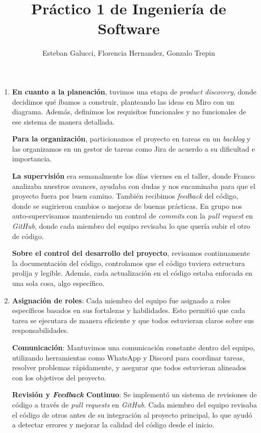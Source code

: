\documentclass{article}
\title{Práctico 1 de Ingeniería de Software}
\author{Esteban Galucci, Florencia Hernandez, Gonzalo Trepin}
\date{}
\begin{document}
\maketitle

\begin{enumerate}

    \item
    \textbf{En cuanto a la planeación}, tuvimos una etapa de \textit{product discovery}, donde decidimos qué íbamos a construir, planteando las ideas en Miro con un diagrama. Además, definimos los requisitos funcionales y no funcionales de ese sistema de manera detallada.

    \textbf{Para la organización}, particionamos el proyecto en tareas en un \textit{backlog} y las organizamos en un gestor de tareas como Jira de acuerdo a su dificultad e importancia.

    \textbf{La supervisión} era semanalmente los días viernes en el taller, donde Franco analizaba nuestros avances, ayudaba con dudas y nos encaminaba para que el proyecto fuera por buen camino. También recibimos \textit{feedback} del código, donde se sugirieron cambios o mejoras de buenas prácticas. En grupo nos auto-supervisamos manteniendo un control de \textit{commits} con la \textit{pull request} en \textit{GitHub}, donde cada miembro del equipo revisaba lo que quería subir el otro de código.

    \textbf{Sobre el control del desarrollo del proyecto}, revisamos continuamente la documentación del código, controlamos que el código tuviera estructura prolija y legible. Además, cada actualización en el código estaba enfocada en una sola cosa, algo específico.

    \item
    \textbf{Asignación de roles}: Cada miembro del equipo fue asignado a roles específicos basados en sus fortalezas y habilidades. Esto permitió que cada tarea se ejecutara de manera eficiente y que todos estuvieran claros sobre sus responsabilidades.

    \textbf{Comunicación}: Mantuvimos una comunicación constante dentro del equipo, utilizando herramientas como WhatsApp y Discord para coordinar tareas, resolver problemas rápidamente, y asegurar que todos estuvieran alineados con los objetivos del proyecto.

    \textbf{Revisión y \textit{Feedback} Continuo}: Se implementó un sistema de revisiones de código a través de \textit{pull requests} en \textit{GitHub}. Cada miembro del equipo revisaba el código de otros antes de su integración al proyecto principal, lo que ayudó a detectar errores y mejorar la calidad del código desde el inicio.


\end{enumerate}
\end{document}
